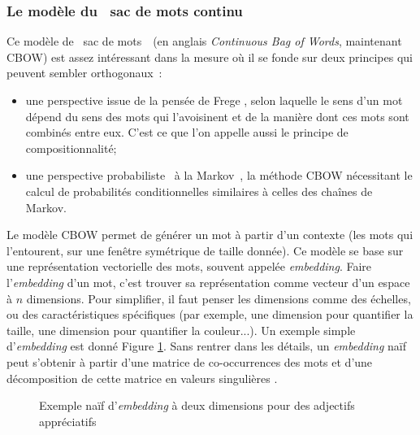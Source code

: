 \documentclass{article}
\begin{document}
			\subsubsection{Le modèle du \guillemotleft~sac de mots continu~\guillemotright}\label{cbow}
				Ce modèle de \guillemotleft~sac de mots~\guillemotright~(en anglais \textit{Continuous Bag of Words}, maintenant CBOW) est assez intéressant dans la mesure où il se fonde sur deux principes qui peuvent sembler orthogonaux~:
				\vspace{2mm}
				\begin{itemize}
					\item une perspective issue de la pensée de Frege \autocite{frege1997}, selon laquelle le sens d'un mot dépend du sens des mots qui l'avoisinent et de la manière dont ces mots sont combinés entre eux. C'est ce que l'on appelle aussi le principe de compositionnalité;
					\item une perspective probabiliste \guillemotleft~à la Markov~\guillemotright, la méthode CBOW nécessitant le calcul de probabilités conditionnelles similaires à celles des chaînes de Markov.
				\end{itemize}
				\vspace{2mm}
				Le modèle CBOW permet de générer un mot à partir d'un contexte (les mots qui l'entourent, sur une fenêtre symétrique de taille donnée). Ce modèle se base sur une représentation vectorielle des mots, souvent appelée \textit{embedding}. Faire l'\textit{embedding} d'un mot, c'est trouver sa représentation comme vecteur d'un espace à $n$ dimensions. Pour simplifier, il faut penser les dimensions comme des échelles, ou des caractéristiques spécifiques (par exemple, une dimension pour quantifier la taille, une dimension pour quantifier la couleur...). Un exemple simple d'\textit{embedding} est donné Figure \ref{embedding}. Sans rentrer dans les détails, un \textit{embedding} naïf peut s'obtenir à partir d'une matrice de co-occurrences des mots et d'une décomposition de cette matrice en valeurs singulières \autocite{socher2016}.
				\begin{figure}[H]
					\centering
				\caption{Exemple naïf d'\textit{embedding} à deux dimensions pour des adjectifs appréciatifs}
				\label{embedding}
				\end{figure}
\end{document}
